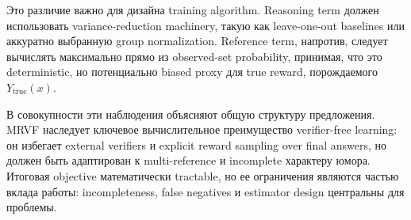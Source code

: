 Это различие важно для дизайна training algorithm. Reasoning term должен использовать variance-reduction machinery, такую как leave-one-out baselines или аккуратно выбранную group normalization. Reference term, напротив, следует вычислять максимально прямо из observed-set probability, принимая, что это deterministic, но потенциально biased proxy для true reward, порождаемого \(Y_{\mathrm{true}}(x)\).

В совокупности эти наблюдения объясняют общую структуру предложения. MRVF наследует ключевое вычислительное преимущество verifier-free learning: он избегает external verifiers и explicit reward sampling over final answers, но должен быть адаптирован к multi-reference и incomplete характеру юмора. Итоговая objective математически tractable, но ее ограничения являются частью вклада работы: incompleteness, false negatives и estimator design центральны для проблемы.
